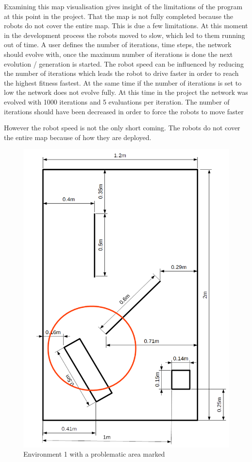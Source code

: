 Examining this map visualisation gives insight of the limitations of the program at this point in the project.
That the map is not fully completed because the robots do not cover the entire map. This is due a few limitations. At this moment in the development process the robots moved to slow, which led to them running out of time. 
A user defines the number of iterations, time steps,  the network should evolve with, once the maximum number of iterations is done the next evolution / generation is started.
The robot speed can be influenced by reducing the number of iterations which leads the robot to drive faster in order to reach the highest fitness fastest. At the same time if the number of iterations is set to low the network does not evolve fully. 
At this time in the project the network was evolved with 1000 iterations and 5 evaluations per iteration.  The number of iterations should have been decreased in order to force the robots to move faster 

However the robot speed is not the only short coming. The robots do not cover the entire map because of how they are deployed. 

\begin{figure}[h]
\centering
\includegraphics[scale=0.4]{Chapter4/images/environment_marked1}
\caption{Environment 1 with a problematic area marked}
\label{fig:enviro_marked1}
\end{figure}


